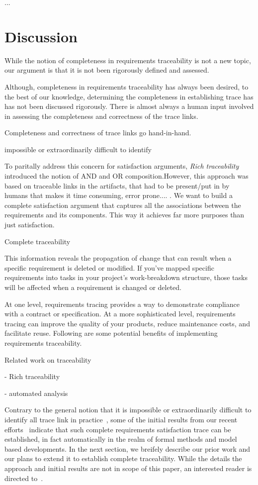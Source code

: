 ...
\section{Discussion}

While the notion of completeness in requirements traceability is not  a new topic, our argument is that it is not been rigorously defined and assessed.


Although, completeness in requirements traceability has always been desired, to the best of our knowledge, determining the completeness in establishing trace has  has not been discussed rigorously. There is almost always a human input involved in assessing the completeness and correctness of the trace links.


Completeness and correctness of trace links go hand-in-hand.



impossible or extraordinarily difficult to identify


To paritally address this concern for satisfaction arguments, \emph{Rich traceability} introduced the notion of AND and OR composition.However, this approach was based on traceable links in the artifacts, that had to be present/put in by humans that makes it time consuming, error prone.... . We want to build a complete satisfaction argument that captures all the associations between the requirements and its components. This way it achieves far more purposes than just satisfaction.

Complete traceability

This information reveals the propagation of change that can result when a specific requirement is deleted or modified. If you’ve mapped specific requirements into tasks in your project’s work-breakdown structure, those tasks will be affected when a requirement is changed or deleted.

At one level, requirements tracing provides a way to demonstrate compliance with a contract or specification. At a more sophisticated level, requirements tracing can improve the quality of your products, reduce maintenance costs, and facilitate reuse. Following are some potential benefits of implementing requirements traceability.


Related work on traceability

- Rich traceability

- automated analysis

Contrary to the general notion that it is impossible or extraordinarily difficult to identify all trace link in practice~\cite{stravsunskas2002traceability}, some of the initial results from our recent efforts~\cite{IVCTechReport} indicate that such complete requirements satisfaction trace can be established, in fact automatically in the realm of formal methods and model based developments. In the next section, we breifely describe our prior work and our plans to extend it to establish complete traceability. While the details the approach and initial results are not in scope of this paper, an interested reader is directed to~\cite{IVCTechReport}.
